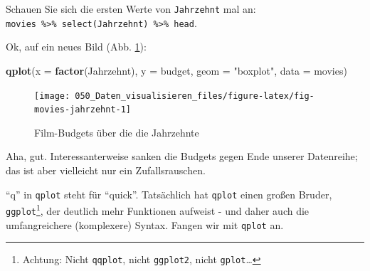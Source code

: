 \documentclass[12pt,ngerman,]{book}
\makeatletter
\newenvironment{Shaded}{\begin{snugshade}}{\end{snugshade}}
\newcommand{\KeywordTok}[1]{\textcolor[rgb]{0.13,0.29,0.53}{\textbf{#1}}}
\newcommand{\DataTypeTok}[1]{\textcolor[rgb]{0.13,0.29,0.53}{#1}}
\newcommand{\DecValTok}[1]{\textcolor[rgb]{0.00,0.00,0.81}{#1}}
\newcommand{\StringTok}[1]{\textcolor[rgb]{0.31,0.60,0.02}{#1}}
\newcommand{\CommentTok}[1]{\textcolor[rgb]{0.56,0.35,0.01}{\textit{#1}}}
\newcommand{\OperatorTok}[1]{\textcolor[rgb]{0.81,0.36,0.00}{\textbf{#1}}}
\newcommand{\NormalTok}[1]{#1}
\let\rmarkdownfootnote\footnote%
\def\footnote{\protect\rmarkdownfootnote}
\newenvironment{kframe}{%
\medskip{}
\setlength{\fboxsep}{.8em}
 \def\at@end@of@kframe{}%
 \ifinner\ifhmode%
  \def\at@end@of@kframe{\end{minipage}}%
  \begin{minipage}{\columnwidth}%
 \fi\fi%
 \def\FrameCommand##1{\hskip\@totalleftmargin \hskip-\fboxsep
 \colorbox{shadecolor}{##1}\hskip-\fboxsep
     \hskip-\linewidth \hskip-\@totalleftmargin \hskip\columnwidth}%
 \MakeFramed {\advance\hsize-\width
   \@totalleftmargin\z@ \linewidth\hsize
   \@setminipage}}%
 {\par\unskip\endMakeFramed%
 \at@end@of@kframe}
\renewenvironment{Shaded}{\begin{kframe}}{\end{kframe}}
\theoremstyle{definition}
\theoremstyle{definition}
\theoremstyle{remark}
\makeatother
\begin{document}
\begin{Shaded}
\end{Shaded}

Schauen Sie sich die ersten Werte von \texttt{Jahrzehnt} mal an:
\texttt{movies\ \%\textgreater{}\%\ select(Jahrzehnt)\ \%\textgreater{}\%\ head}.

Ok, auf ein neues Bild (Abb. \ref{fig:fig-movies-jahrzehnt}):

\begin{Shaded}
\begin{Highlighting}[]

\KeywordTok{qplot}\NormalTok{(}\DataTypeTok{x =} \KeywordTok{factor}\NormalTok{(Jahrzehnt), }
      \DataTypeTok{y =}\NormalTok{ budget, }
      \DataTypeTok{geom =} \StringTok{"boxplot"}\NormalTok{, }
      \DataTypeTok{data =}\NormalTok{ movies) }
\end{Highlighting}
\end{Shaded}

\begin{figure}

{\centering \texttt{[image: 050\_Daten\_visualisieren\_files/figure-latex/fig-movies-jahrzehnt-1]} 

}

\caption{Film-Budgets über die die Jahrzehnte}\label{fig:fig-movies-jahrzehnt}
\end{figure}

Aha, gut. Interessanterweise sanken die Budgets gegen Ende unserer
Datenreihe; das ist aber vielleicht nur ein Zufallsrauschen.

``q'' in \texttt{qplot} steht für ``quick''. Tatsächlich hat
\texttt{qplot} einen großen Bruder, \texttt{ggplot}\footnote{Achtung:
  Nicht \texttt{qqplot}, nicht \texttt{ggplot2}, nicht
  \texttt{gplot}\ldots{}}, der deutlich mehr Funktionen aufweist - und
daher auch die umfangreichere (komplexere) Syntax. Fangen wir mit
\texttt{qplot} an.
\end{document}
